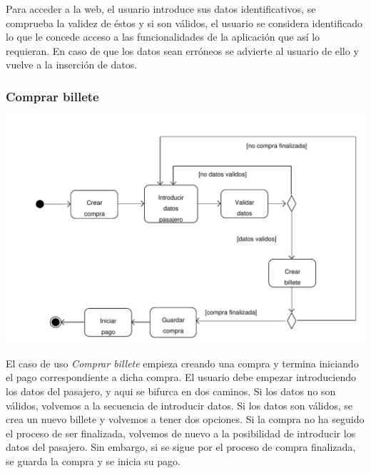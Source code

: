 \documentclass[11pt, a4paper, twoside, titlepage]{article}
\begin{document}
				Para acceder a la web, el usuario introduce sus datos identificativos, se comprueba la validez de éstos y si son válidos, el usuario se considera identificado lo que le concede acceso a las funcionalidades de la aplicación que así lo requieran. En caso de que los datos sean erróneos se advierte al usuario de ello y vuelve a la inserción de datos.

			\subsubsection{Comprar billete}
				\begin{center}
					\hspace*{-1cm} \includegraphics[scale=.65]{analisis/diagramas/da_comprarbillete.pdf}
				\end{center}
				El caso de uso {\itshape Comprar billete} empieza creando una compra y termina iniciando el pago correspondiente a dicha compra.
				El usuario debe empezar introduciendo los datos del pasajero, y aqui se bifurca en dos caminos. Si los datos no son válidos, volvemos a la secuencia de introducir datos. Si los datos son válidos, se crea un nuevo billete y volvemos a tener dos opciones. Si la compra no ha seguido el proceso de ser finalizada, volvemos de nuevo a la posibilidad de introducir los datos del pasajero. Sin embargo, si se sigue por el proceso de compra finalizada, se guarda la compra y se inicia su pago.
\end{document}

